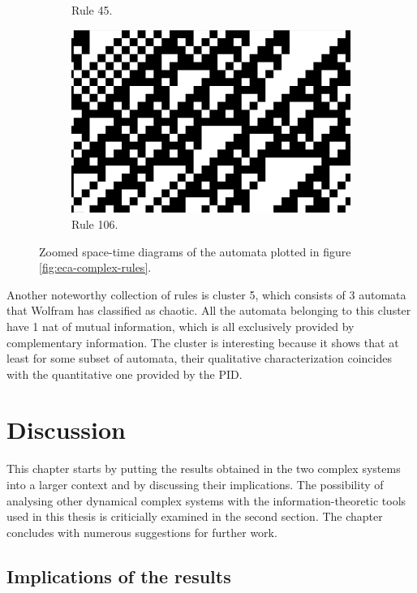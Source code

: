 \documentclass[12pt]{article}
\begin{document}
\begin{figure} [h]
\begin{subfigure}{.5\textwidth}
  \caption{Rule 45.}
  \label{fig:rule45-zoomed}
\end{subfigure}
\begin{subfigure}{.5\textwidth}
  \centering
  \includegraphics[width=.9\linewidth]{rule106-zoomed}
  \caption{Rule 106.}
  \label{fig:rule106-zoomed}
\end{subfigure}
\caption{Zoomed space-time diagrams of the automata plotted in figure \ref{fig:eca-complex-rules}.}
\label{fig:eca-complex-rules-zoomed}
\end{figure}

Another noteworthy collection of rules is cluster 5, which consists  of 3 automata that Wolfram has classified as chaotic. All the automata belonging to this cluster have 1 nat of mutual information, which is all exclusively provided by complementary information. The cluster is interesting because it shows that at least for some subset of automata, their qualitative characterization coincides with the quantitative one provided by the PID. 

\newpage
\section{Discussion}

This chapter starts by putting the results obtained in the two complex systems into a larger context and by discussing their implications. The possibility of analysing other dynamical complex systems with the information-theoretic tools used in this thesis is criticially examined in the second section. The chapter concludes with numerous suggestions for further work. 

\subsection{Implications of the results}
\end{document}
